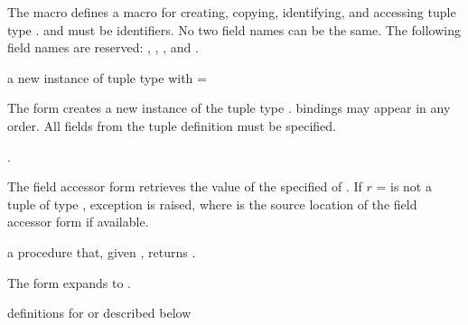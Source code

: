 The  macro defines a macro for creating,
copying, identifying, and accessing tuple type . 
and  \etc{} must be identifiers. No two field names can be
the same. The following field names are reserved: ,
, , and .

\begin{syntax}
\end{syntax}
\returns{} a new instance of tuple type  with  =
 \etc{}

The  form creates a new instance of the tuple type
.  bindings may appear in any order. All fields
from the tuple definition must be specified.

\begin{syntax}
\end{syntax}
\returns{} .

The field accessor form retrieves the value of the specified
 of . If $r$ =  is not a tuple
of type , exception  is raised, where  is the source location of the
field accessor form if available.

\begin{syntax}
\end{syntax}
\returns{} a procedure that, given , returns .

The  form expands to .

\begin{syntax}
\end{syntax}
\expandsto{} definitions for  \etc{} or  \etc{} described below

